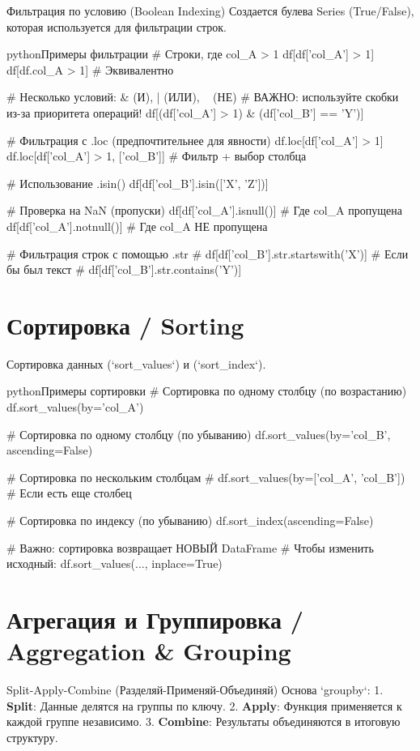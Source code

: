 \begin{myexampleblock}{Фильтрация по условию (Boolean Indexing)}
Создается булева Series (True/False), которая используется для фильтрации строк.

\begin{codebox}{python}{Примеры фильтрации}
# Строки, где col_A > 1
df[df['col_A'] > 1]
df[df.col_A > 1] # Эквивалентно

# Несколько условий: & (И), | (ИЛИ), ~ (НЕ)
# ВАЖНО: используйте скобки из-за приоритета операций!
df[(df['col_A'] > 1) & (df['col_B'] == 'Y')]

# Фильтрация с .loc (предпочтительнее для явности)
df.loc[df['col_A'] > 1]
df.loc[df['col_A'] > 1, ['col_B']] # Фильтр + выбор столбца

# Использование .isin()
df[df['col_B'].isin(['X', 'Z'])]

# Проверка на NaN (пропуски)
df[df['col_A'].isnull()]    # Где col_A пропущена
df[df['col_A'].notnull()]   # Где col_A НЕ пропущена

# Фильтрация строк с помощью .str
# df[df['col_B'].str.startswith('X')] # Если бы был текст
# df[df['col_B'].str.contains('Y')]
\end{codebox}
\end{myexampleblock}

\section{Сортировка / Sorting}
\begin{textbox}{Сортировка данных}
 (`sort\_values`) и  (`sort\_index`).

\begin{codebox}{python}{Примеры сортировки}
# Сортировка по одному столбцу (по возрастанию)
df.sort_values(by='col_A')

# Сортировка по одному столбцу (по убыванию)
df.sort_values(by='col_B', ascending=False)

# Сортировка по нескольким столбцам
# df.sort_values(by=['col_A', 'col_B']) # Если есть еще столбец

# Сортировка по индексу (по убыванию)
df.sort_index(ascending=False)

# Важно: сортировка возвращает НОВЫЙ DataFrame
# Чтобы изменить исходный: df.sort_values(..., inplace=True)
\end{codebox}
\end{textbox}

\section{Агрегация и Группировка / Aggregation \& Grouping}
\begin{myblock}{Split-Apply-Combine (Разделяй-Применяй-Объединяй)}
Основа `groupby`:
1.  \textbf{Split}: Данные делятся на группы по ключу.
2.  \textbf{Apply}: Функция применяется к каждой группе независимо.
3.  \textbf{Combine}: Результаты объединяются в итоговую структуру.
\end{myblock}


